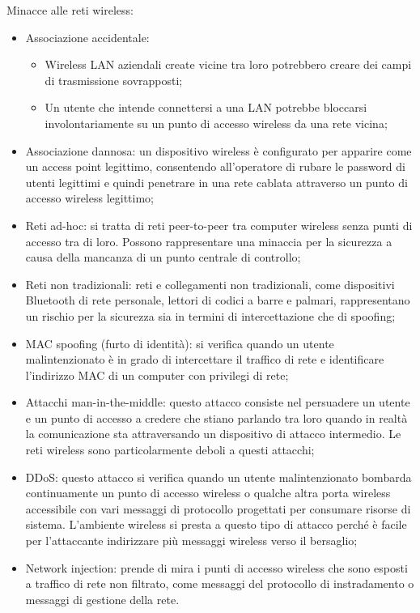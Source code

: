 Minacce alle reti wireless:
\begin{itemize}
    \item Associazione accidentale: 
	\begin{itemize}
	    \item Wireless LAN aziendali create vicine tra loro potrebbero creare dei campi di trasmissione sovrapposti;
		\item Un utente che intende connettersi a una LAN potrebbe bloccarsi involontariamente su un punto di accesso wireless da una rete vicina;
	\end{itemize}
	\item Associazione dannosa: un dispositivo wireless è configurato per apparire come un access point legittimo, consentendo all'operatore di rubare le password di utenti legittimi e quindi penetrare in una rete cablata attraverso un punto di accesso wireless legittimo;
	\item Reti ad-hoc: si tratta di reti peer-to-peer tra computer wireless senza punti di accesso tra di loro. Possono rappresentare una minaccia per la sicurezza a causa della mancanza di un punto centrale di controllo;
	\item Reti non tradizionali: reti e collegamenti non tradizionali, come dispositivi Bluetooth di rete personale, lettori di codici a barre e palmari, rappresentano un rischio per la sicurezza sia in termini di intercettazione che di spoofing;
	\item MAC spoofing (furto di identità): si verifica quando un utente malintenzionato è in grado di intercettare il traffico di rete e identificare l'indirizzo MAC di un computer con privilegi di rete;
	\item Attacchi man-in-the-middle: questo attacco consiste nel persuadere un utente e un punto di accesso a credere che stiano parlando tra loro quando in realtà la comunicazione sta attraversando un dispositivo di attacco intermedio. Le reti wireless sono particolarmente deboli a questi attacchi;
	\item DDoS: questo attacco si verifica quando un utente malintenzionato bombarda continuamente un punto di accesso wireless o qualche altra porta wireless accessibile con vari messaggi di protocollo progettati per consumare risorse di sistema. L'ambiente wireless si presta a questo tipo di attacco perché è facile per l'attaccante indirizzare più messaggi wireless verso il bersaglio;
	\item Network injection: prende di mira i punti di accesso wireless che sono esposti a traffico di rete non filtrato, come messaggi del protocollo di instradamento o messaggi di gestione della rete.
\end{itemize}
		
